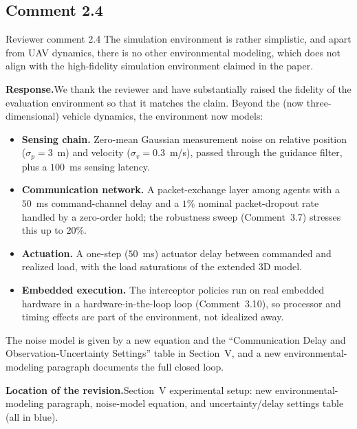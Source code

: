 \documentclass[11pt]{article}
\newcommand{\rsp}{\medskip\noindent\textbf{Response.}\quad}
\newcommand{\loc}{\medskip\noindent\textbf{Location of the revision.}\quad}
\begin{document}
\clearpage

\subsection*{Comment 2.4 }

\begin{reviewercomment}{Reviewer comment 2.4}
The simulation environment is rather simplistic, and apart from UAV dynamics, there
is no other environmental modeling, which does not align with the high-fidelity
simulation environment claimed in the paper.
\end{reviewercomment}

\rsp We thank the reviewer and have substantially raised the fidelity of the
evaluation environment so that it matches the claim. Beyond the (now
three-dimensional) vehicle dynamics, the environment now models:
\begin{itemize}
  \item \textbf{Sensing chain.} Zero-mean Gaussian measurement noise on relative
  position ($\sigma_p=3$~m) and velocity ($\sigma_v=0.3$~m/s), passed through the
  guidance filter, plus a $100$~ms sensing latency.
  \item \textbf{Communication network.} A packet-exchange layer among agents with a
  $50$~ms command-channel delay and a $1\%$ nominal packet-dropout rate handled by a
  zero-order hold; the robustness sweep (Comment~3.7) stresses this up to $20\%$.
  \item \textbf{Actuation.} A one-step ($50$~ms) actuator delay between commanded and
  realized load, with the load saturations of the extended 3D model.
  \item \textbf{Embedded execution.} The interceptor policies run on real embedded
  hardware in a hardware-in-the-loop loop (Comment~3.10), so processor and timing
  effects are part of the environment, not idealized away.
\end{itemize}
The noise model is given by a new equation and the ``Communication Delay and
Observation-Uncertainty Settings'' table in Section~V, and a new environmental-modeling
paragraph documents the full closed loop.

\loc Section~V experimental setup: new environmental-modeling paragraph, noise-model
equation, and uncertainty/delay settings table (all in blue).

\end{document}
